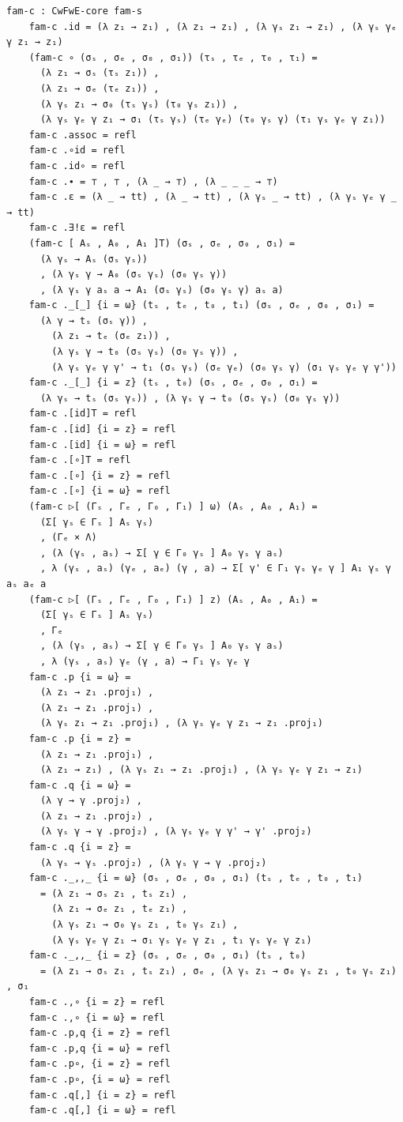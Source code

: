 \documentclass[10pt,a4paper]{article}
\theoremstyle{definition}
\theoremstyle{remark}
\begin{document}
{\begin{Verbatim}[breaklines=true,breakanywhere=true,fontsize=\scriptsize]
    fam-c : CwFwE-core fam-s
    fam-c .id = (λ z₁ → z₁) , (λ z₁ → z₁) , (λ γₛ z₁ → z₁) , (λ γₛ γₑ γ z₁ → z₁)
    (fam-c ∘ (σₛ , σₑ , σ₀ , σ₁)) (τₛ , τₑ , τ₀ , τ₁) =
      (λ z₁ → σₛ (τₛ z₁)) ,
      (λ z₁ → σₑ (τₑ z₁)) ,
      (λ γₛ z₁ → σ₀ (τₛ γₛ) (τ₀ γₛ z₁)) ,
      (λ γₛ γₑ γ z₁ → σ₁ (τₛ γₛ) (τₑ γₑ) (τ₀ γₛ γ) (τ₁ γₛ γₑ γ z₁))
    fam-c .assoc = refl
    fam-c .∘id = refl
    fam-c .id∘ = refl
    fam-c .∙ = ⊤ , ⊤ , (λ _ → ⊤) , (λ _ _ _ → ⊤)
    fam-c .ε = (λ _ → tt) , (λ _ → tt) , (λ γₛ _ → tt) , (λ γₛ γₑ γ _ → tt)
    fam-c .∃!ε = refl
    (fam-c [ Aₛ , A₀ , A₁ ]T) (σₛ , σₑ , σ₀ , σ₁) =
      (λ γₛ → Aₛ (σₛ γₛ))
      , (λ γₛ γ → A₀ (σₛ γₛ) (σ₀ γₛ γ))
      , (λ γₛ γ aₛ a → A₁ (σₛ γₛ) (σ₀ γₛ γ) aₛ a)
    fam-c ._[_] {i = ω} (tₛ , tₑ , t₀ , t₁) (σₛ , σₑ , σ₀ , σ₁) =
      (λ γ → tₛ (σₛ γ)) ,
        (λ z₁ → tₑ (σₑ z₁)) ,
        (λ γₛ γ → t₀ (σₛ γₛ) (σ₀ γₛ γ)) ,
        (λ γₛ γₑ γ γ' → t₁ (σₛ γₛ) (σₑ γₑ) (σ₀ γₛ γ) (σ₁ γₛ γₑ γ γ'))
    fam-c ._[_] {i = z} (tₛ , t₀) (σₛ , σₑ , σ₀ , σ₁) =
      (λ γₛ → tₛ (σₛ γₛ)) , (λ γₛ γ → t₀ (σₛ γₛ) (σ₀ γₛ γ))
    fam-c .[id]T = refl
    fam-c .[id] {i = z} = refl
    fam-c .[id] {i = ω} = refl
    fam-c .[∘]T = refl
    fam-c .[∘] {i = z} = refl
    fam-c .[∘] {i = ω} = refl
    (fam-c ▷[ (Γₛ , Γₑ , Γ₀ , Γ₁) ] ω) (Aₛ , A₀ , A₁) =
      (Σ[ γₛ ∈ Γₛ ] Aₛ γₛ)
      , (Γₑ × Λ)
      , (λ (γₛ , aₛ) → Σ[ γ ∈ Γ₀ γₛ ] A₀ γₛ γ aₛ)
      , λ (γₛ , aₛ) (γₑ , aₑ) (γ , a) → Σ[ γ' ∈ Γ₁ γₛ γₑ γ ] A₁ γₛ γ aₛ aₑ a
    (fam-c ▷[ (Γₛ , Γₑ , Γ₀ , Γ₁) ] z) (Aₛ , A₀ , A₁) =
      (Σ[ γₛ ∈ Γₛ ] Aₛ γₛ)
      , Γₑ
      , (λ (γₛ , aₛ) → Σ[ γ ∈ Γ₀ γₛ ] A₀ γₛ γ aₛ)
      , λ (γₛ , aₛ) γₑ (γ , a) → Γ₁ γₛ γₑ γ
    fam-c .p {i = ω} =
      (λ z₁ → z₁ .proj₁) ,
      (λ z₁ → z₁ .proj₁) ,
      (λ γₛ z₁ → z₁ .proj₁) , (λ γₛ γₑ γ z₁ → z₁ .proj₁)
    fam-c .p {i = z} =
      (λ z₁ → z₁ .proj₁) ,
      (λ z₁ → z₁) , (λ γₛ z₁ → z₁ .proj₁) , (λ γₛ γₑ γ z₁ → z₁)
    fam-c .q {i = ω} =
      (λ γ → γ .proj₂) ,
      (λ z₁ → z₁ .proj₂) ,
      (λ γₛ γ → γ .proj₂) , (λ γₛ γₑ γ γ' → γ' .proj₂)
    fam-c .q {i = z} =
      (λ γₛ → γₛ .proj₂) , (λ γₛ γ → γ .proj₂)
    fam-c ._,,_ {i = ω} (σₛ , σₑ , σ₀ , σ₁) (tₛ , tₑ , t₀ , t₁)
      = (λ z₁ → σₛ z₁ , tₛ z₁) ,
        (λ z₁ → σₑ z₁ , tₑ z₁) ,
        (λ γₛ z₁ → σ₀ γₛ z₁ , t₀ γₛ z₁) ,
        (λ γₛ γₑ γ z₁ → σ₁ γₛ γₑ γ z₁ , t₁ γₛ γₑ γ z₁)
    fam-c ._,,_ {i = z} (σₛ , σₑ , σ₀ , σ₁) (tₛ , t₀)
      = (λ z₁ → σₛ z₁ , tₛ z₁) , σₑ , (λ γₛ z₁ → σ₀ γₛ z₁ , t₀ γₛ z₁) , σ₁
    fam-c .,∘ {i = z} = refl
    fam-c .,∘ {i = ω} = refl
    fam-c .p,q {i = z} = refl
    fam-c .p,q {i = ω} = refl
    fam-c .p∘, {i = z} = refl
    fam-c .p∘, {i = ω} = refl
    fam-c .q[,] {i = z} = refl
    fam-c .q[,] {i = ω} = refl


\end{Verbatim}}
\end{document}
